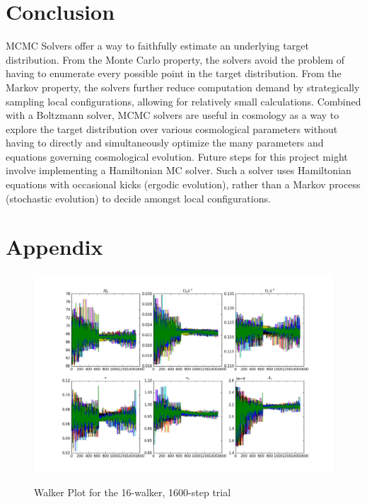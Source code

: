 \documentclass[aps,prd,final,twocolumn]{revtex4}
\begin{document}
\section{Conclusion}
MCMC Solvers offer a way to faithfully estimate an underlying target distribution. From the Monte Carlo property, the solvers avoid the problem of having to enumerate every possible point in the target distribution. From the Markov property, the solvers further reduce computation demand by strategically sampling local configurations, allowing for relatively small calculations. Combined with a Boltzmann solver, MCMC solvers are useful in cosmology as a way to explore the target distribution over various cosmological parameters without having to directly and simultaneously optimize the many parameters and equations governing cosmological evolution. Future steps for this project might involve implementing a Hamiltonian MC solver. Such a solver uses Hamiltonian equations with occasional kicks (ergodic evolution), rather than a Markov process (stochastic evolution) to decide amongst local configurations.

\section{Appendix}
\begin{figure}
\begin{center}
\includegraphics[scale=.4]{runs_16_800.png}
\label{fig:f1}
\caption{Walker Plot for the 16-walker, 1600-step trial}
\end{center}
\end{figure}
\end{document}
